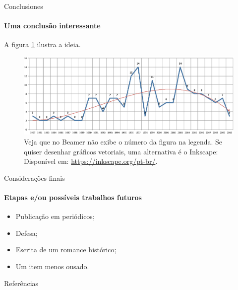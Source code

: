 \documentclass[aspectratio=169]{beamer}
\begin{document}
\begin{frame}{Conclusiones}
\framesubtitle{Uma conclusão interessante}
A figura \ref{fig:grafxxx} ilustra a ideia.
\begin{figure}[hbtp]
	\centering
	\includegraphics[scale=0.3]{figuras/abntex2-modelo-img-grafico.pdf}
	\caption{Veja que no Beamer não exibe o número da figura na legenda. Se quiser desenhar gráficos vetoriais, uma alternativa é o Inkscape: Disponível em: \url{https://inkscape.org/pt-br/}.} 
	\label{fig:grafxxx} 
\end{figure}
\end{frame}

\begin{frame}{Considerações finais}
\framesubtitle{Etapas e/ou possíveis trabalhos futuros}
\begin{itemize}
	\item[\grimace] Publicação em periódicos; 
	\item[\textthing] Defesa;
	\item[\bomb] Escrita de um romance histórico;
	\item Um item menos ousado. 
\end{itemize}
\end{frame}


\begin{frame}[allowframebreaks]{Referências}
\printbibliography
\end{frame}

\end{document}
